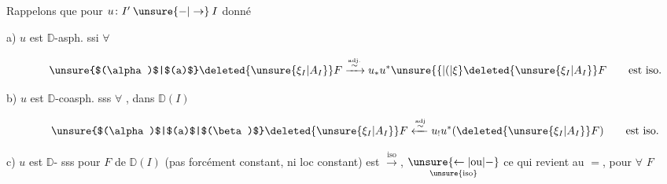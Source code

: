 Rappelons que pour $u\colon I'\mathbin{\unsure{-|\to}}I$ donné

a) $u$ est $\mathbb{D}$-asph. ssi $\forall$ \unsure{,}

\[
 \tag*{\unsure{$(\alpha)$|$(a)$}}
 \deleted{\unsure{\xi_I|A_I}}F\xrightarrow{\overset{\mathrm{adj.}}{\sim}}
 u_*u^*\unsure{\{|(|\xi}\deleted{\unsure{\xi_I|A_I}}F
 \qquad\text{est iso.}
\]

b) $u$ est $\mathbb{D}$-coasph. sss $\forall$ \deleted{\unsure{$\xi$}} \uline{}, dans $\mathbb{D}(I)$

\[
 \tag*{\unsure{$(\alpha)$|$(a)$|$(\beta)$}}
 \deleted{\unsure{\xi_I|A_I}}F\xleftarrow{\overset{\mathrm{adj}}{\sim}}
 u_!u^*(\deleted{\unsure{\xi_I|A_I}}F)\qquad\text{est iso.}
\]

c) $u$ est $\mathbb{D}$-  sss pour \uuline{$\forall$} $F$ de $\mathbb{D}(I)$  (pas forcément constant, ni loc constant)  est $\xrightarrow{\mathrm{iso}}$, $\underset{\unsure{\mathrm{iso}}}{\unsure{\leftarrow|\text{ou}|-}}$ ce qui revient au $=$, pour $\forall$ $F$ 
